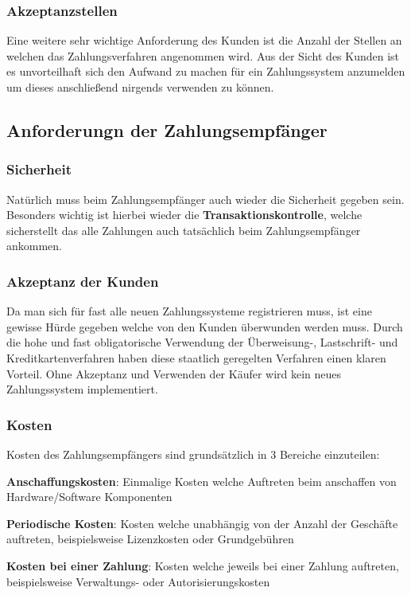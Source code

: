 \subsubsection{Akzeptanzstellen}
Eine weitere sehr wichtige Anforderung des Kunden ist die Anzahl der Stellen an welchen das Zahlungsverfahren angenommen wird. Aus der Sicht des Kunden ist es unvorteilhaft sich den Aufwand zu machen für ein Zahlungssystem anzumelden um dieses anschließend nirgends verwenden zu können.

\subsection{Anforderungn der Zahlungsempfänger}
\subsubsection{Sicherheit}
Natürlich muss beim Zahlungsempfänger auch wieder die Sicherheit gegeben sein. Besonders wichtig ist hierbei wieder die \textbf{Transaktionskontrolle}, welche sicherstellt das alle Zahlungen auch tatsächlich beim Zahlungsempfänger ankommen. 

\subsubsection{Akzeptanz der Kunden}
Da man sich für fast alle neuen Zahlungssysteme registrieren muss, ist eine gewisse Hürde gegeben welche von den Kunden überwunden werden muss. Durch die hohe und fast obligatorische Verwendung der Überweisung-, Lastschrift- und Kreditkartenverfahren haben diese staatlich geregelten Verfahren einen klaren Vorteil. Ohne Akzeptanz und Verwenden der Käufer wird kein neues Zahlungssystem implementiert.

\subsubsection{Kosten}
Kosten des Zahlungsempfängers sind grundsätzlich in 3 Bereiche einzuteilen:

\textbf{Anschaffungskosten}: Einmalige Kosten welche Auftreten beim anschaffen von Hardware/Software Komponenten

\textbf{Periodische Kosten}: Kosten welche unabhängig von der Anzahl der Geschäfte auftreten, beispielsweise Lizenzkosten oder Grundgebühren

\textbf{Kosten bei einer Zahlung}: Kosten welche jeweils bei einer Zahlung auftreten, beispielsweise Verwaltungs- oder Autorisierungskosten




